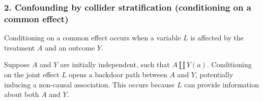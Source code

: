 \documentclass[
  singlecolumn]{article}
\begin{document}
\hypertarget{confounding-by-collider-stratification-conditioning-on-a-common-effect}{%
\subsubsection{2. Confounding by collider stratification (conditioning
on a common
effect)}\label{confounding-by-collider-stratification-conditioning-on-a-common-effect}}

Conditioning on a common effect occurs when a variable \(L\) is affected
by the treatment \(A\) and an outcome \(Y\).

Suppose \(A\) and \(Y\) are initially independent, such that
\(A \coprod Y(a)\). Conditioning on the joint effect \(L\) opens a
backdoor path between \(A\) and \(Y\), potentially inducing a non-causal
association. This occurs because \(L\) can provide information about
both \(A\) and \(Y\).
\end{document}
